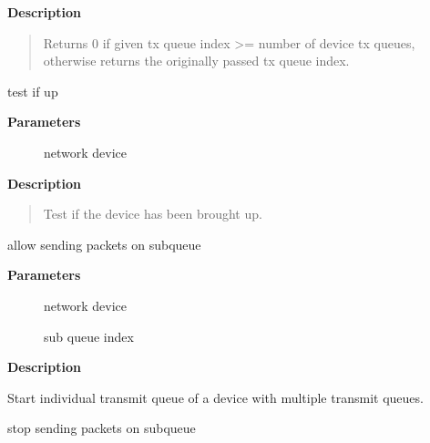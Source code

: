 \documentclass[a4paper,8pt,english]{sphinxmanual}
\begin{document}
\textbf{Description}
\begin{quote}

Returns 0 if given tx queue index \textgreater{}= number of device tx queues,
otherwise returns the originally passed tx queue index.
\end{quote}

\begin{fulllineitems}
\label{networking/kapi:c.netif_running}
test if up

\end{fulllineitems}


\textbf{Parameters}
\begin{description}
\item[{}] \leavevmode
network device

\end{description}

\textbf{Description}
\begin{quote}

Test if the device has been brought up.
\end{quote}

\begin{fulllineitems}
\label{networking/kapi:c.netif_start_subqueue}
allow sending packets on subqueue

\end{fulllineitems}


\textbf{Parameters}
\begin{description}
\item[{}] \leavevmode
network device

\item[{}] \leavevmode
sub queue index

\end{description}

\textbf{Description}

Start individual transmit queue of a device with multiple transmit queues.

\begin{fulllineitems}
\label{networking/kapi:c.netif_stop_subqueue}
stop sending packets on subqueue

\end{fulllineitems}
\end{document}
